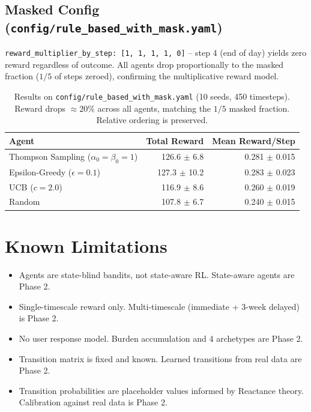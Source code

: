 \documentclass[11pt]{article}
\begin{document}
\subsection{Masked Config (\texttt{config/rule\_based\_with\_mask.yaml})}
\texttt{reward\_multiplier\_by\_step: [1, 1, 1, 1, 0]} -- step 4 (end of day) yields zero reward regardless of outcome. All agents drop proportionally to the masked fraction ($1/5$ of steps zeroed), confirming the multiplicative reward model.

\begin{table}[h]
\centering
\begin{tabular}{lrr}
\toprule
Agent & Total Reward & Mean Reward/Step \\
\midrule
Thompson Sampling ($\alpha_0=\beta_0=1$) & 126.6 $\pm$ 6.8 & 0.281 $\pm$ 0.015 \\
Epsilon-Greedy ($\epsilon=0.1$) & 127.3 $\pm$ 10.2 & 0.283 $\pm$ 0.023 \\
UCB ($c=2.0$) & 116.9 $\pm$ 8.6 & 0.260 $\pm$ 0.019 \\
Random & 107.8 $\pm$ 6.7 & 0.240 $\pm$ 0.015 \\
\bottomrule
\end{tabular}
\caption{Results on \texttt{config/rule\_based\_with\_mask.yaml} (10 seeds, 450 timesteps). Reward drops $\approx 20\%$ across all agents, matching the $1/5$ masked fraction. Relative ordering is preserved.}
\end{table}

\section{Known Limitations}

\begin{itemize}
\item Agents are state-blind bandits, not state-aware RL. State-aware agents are Phase 2.
\item Single-timescale reward only. Multi-timescale (immediate + 3-week delayed) is Phase 2.
\item No user response model. Burden accumulation and 4 archetypes are Phase 2.
\item Transition matrix is fixed and known. Learned transitions from real data are Phase 2.
\item Transition probabilities are placeholder values informed by Reactance theory. Calibration against real data is Phase 2.
\end{itemize}
\end{document}
